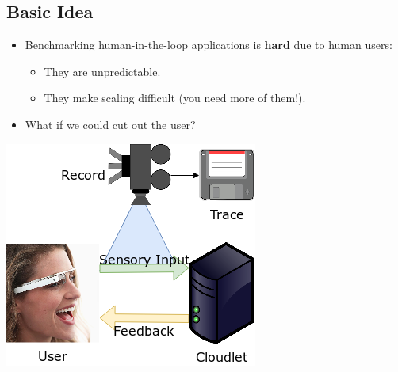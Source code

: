 \documentclass[portrait, a1]{KTHEEposter}
\begin{document}
\begin{pcolumns}[3]
\begin{pcolumn}[2]
\begin{pframe}[1.3]
                \section{Basic Idea}
                \begin{itemize}
                    \item Benchmarking human-in-the-loop applications is \textbf{hard} due to human users:
                    \begin{itemize}
                        \item They are unpredictable.
                        \item They make scaling difficult (you need more of them!).
                    \end{itemize}
                    \item What if we could cut out the user?
                \end{itemize}
                \medskip
                \begin{center}
                    \medskip
                    \makeatletter
                    \let\theoldfigure=\fnum@figure
                    \renewcommand{\fnum@figure}{Step~\thefigure}
                    \makeatother
                    \includegraphics[width=.75\linewidth]{img/trace_idea_1}
                    
                    \medskip\medskip
                    

\end{center}
\end{pframe}
\end{pcolumn}
\end{pcolumns}
\end{document}
